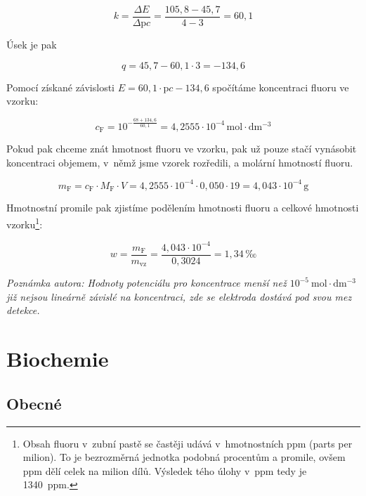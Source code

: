 \documentclass{book}
\begin{document}
\[
k=\frac{\Delta E}{\Delta\mathrm{p}c}=\frac{105,8-45,7}{4-3}=60,1
\]

Úsek je pak

\[
q=45,7-60,1\cdot3=-134,6
\]

Pomocí získané závislosti $E=60,1\cdot\mathrm{p}c-134,6$ spočítáme
koncentraci fluoru ve vzorku:

\[
c_{\mathrm{F}}=10^{-\frac{68+134,6}{60,1}}=4,2555\cdot10^{-4}\,\mathrm{mol\cdot dm^{-3}}
\]

Pokud pak chceme znát hmotnost fluoru ve vzorku, pak už pouze stačí
vynásobit koncentraci objemem, v~němž jsme vzorek rozředili, a molární
hmotností fluoru.

\[
m_{\mathrm{F}}=c_{\mathrm{F}}\cdot M_{\mathrm{F}}\cdot V=4,2555\cdot10^{-4}\cdot0,050\cdot19=4,043\cdot10^{-4}\,\mathrm{g}
\]

Hmotnostní promile pak zjistíme podělením hmotnosti fluoru a celkové
hmotnosti vzorku\footnote{Obsah fluoru v~zubní pastě se častěji udává v~hmotnostních ppm (parts
per milion). To je bezrozměrná jednotka podobná procentům a promile, ovšem
ppm dělí celek na milion dílů. Výsledek tého úlohy v~ppm tedy je 1340~ppm.}:

\[
w=\frac{m_{\mathrm{F}}}{m_{\mathrm{vz}}}=\frac{4,043\cdot10^{-4}}{0,3024}=1,34\, \text{‰}
\]

\textit{Poznámka autora: Hodnoty potenciálu pro koncentrace menší
než $10^{-5}\:\mathrm{mol\cdot dm^{-3}}$ již nejsou lineárně závislé
na koncentraci, zde se elektroda dostává pod svou mez detekce.}

\chapter{Biochemie}

\section{Obecné}
\end{document}
